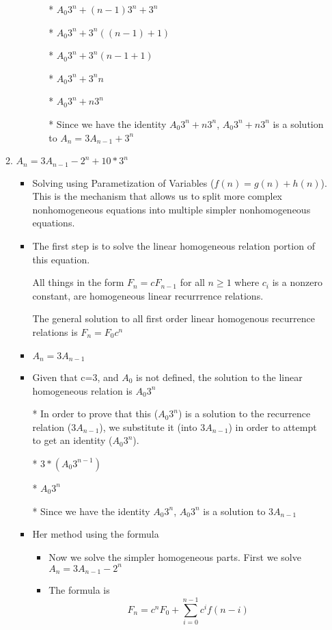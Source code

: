 \documentclass{article}
\begin{document}
\begin{enumerate}
\begin{enumerate}
\begin{itemize}
\begin{itemize}
      \item [*] $A_{0}3^{n} + (n-1)3^{n} + 3^{n}$
      \item [*] $A_{0}3^{n} + 3^{n}((n-1) + 1)$
      \item [*] $A_{0}3^{n} + 3^{n}(n-1+1)$
      \item [*] $A_{0}3^{n} + 3^{n}n$
      \item [*] $A_{0}3^{n} + n3^{n}$
      \item [*] Since we have the identity $A_{0}3^{n}+n3^{n}$, $A_{0}3^{n}+n3^{n}$ is a solution to $A_{n}=3A_{n-1}+3^{n}$
      \end{itemize} %
    \end{itemize}
  \item $A_{n}=3A_{n-1}-2^{n}+10*3^{n}$
    \begin{itemize} %
    \item Solving using Parametization of Variables ($f(n)=g(n)+h(n)$). This is the mechanism that allows us to split more complex nonhomogeneous equations into multiple simpler nonhomogeneous equations.
    \item The first step is to solve the linear homogeneous relation portion of this equation.
    \item [] All things in the form $F_{n}=cF_{n-1}$ for all $n\geq1$ where $c_{i}$ is a nonzero constant, are homogeneous linear recurrrence relations.
    \item [] The general solution to all first order linear homogenous recurrence relations is $F_{n}=F_{0}c^{n}$
    \item $A_{n}=3A_{n-1}$
    \item Given that c=3, and $A_{0}$ is not defined, the solution to the linear homogeneous relation is $A_{0}3^{n}$
    \item [*] In order to prove that this ($A_{0}3^{n}$) is a solution to the recurrence relation ($3A_{n-1}$), we substitute it (into $3A_{n-1}$) in order to attempt to get an identity ($A_{0}3^{n}$).
    \item [*] $3*(A_{0}3^{n-1})$
    \item [*] $A_{0}3^{n}$
    \item [*] Since we have the identity $A_{0}3^{n}$, $A_{0}3^{n}$ is a solution to $3A_{n-1}$
    \item Her method using the formula
      \begin{itemize} %
      \item Now we solve the simpler homogeneous parts. First we solve $A_{n}=3A_{n-1}-2^{n}$
      \item The formula is $$F_{n}=c^{n}F_{0} + \sum\limits_{i=0}^{n-1}c^{i}f(n-i)$$

\end{itemize}
\end{itemize}
\end{enumerate}
\end{enumerate}
\end{document}
